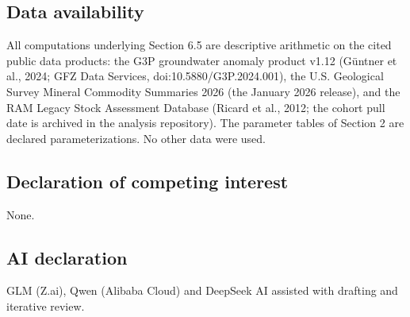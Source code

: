 \documentclass[11pt]{article}
\begin{document}
\subsection*{Data availability}

All computations underlying Section 6.5 are descriptive arithmetic on
the cited public data products: the G3P groundwater anomaly product
v1.12 (G\"untner et al., 2024; GFZ Data Services,
doi:10.5880/G3P.2024.001), the U.S. Geological Survey Mineral Commodity
Summaries 2026 (the January 2026 release), and the RAM Legacy Stock
Assessment Database (Ricard et al., 2012; the cohort pull date is
archived in the analysis repository). The parameter tables of Section 2
are declared parameterizations. No other data were used.

\subsection*{Declaration of competing interest}

None.

\subsection*{AI declaration}
GLM (Z.ai), Qwen (Alibaba Cloud) and DeepSeek AI assisted with drafting and iterative review.
\end{document}
